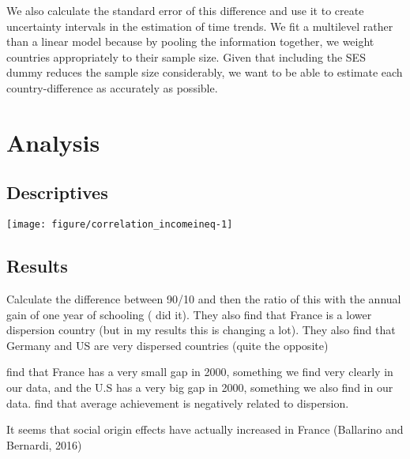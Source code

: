 \documentclass[11pt, a4paper]{article}\usepackage[]{graphicx}\usepackage[]{color}
\begin{document}
We also calculate the standard error of this difference and use it to create uncertainty intervals in the estimation of time trends. We fit a multilevel rather than a linear model because by pooling the information together, we weight countries appropriately to their sample size. Given that including the SES dummy reduces the sample size considerably, we want to be able to estimate each country-difference as accurately as possible.

\section{Analysis}

\subsection{Descriptives}










{\centering \texttt{[image: figure/correlation\_incomeineq-1]} 

}




\subsection{Results}

Calculate the difference between 90/10 and then the ratio of this with the annual gain of one year of schooling (\citet{micklewright} did it). They also find that France is a lower dispersion country (but in my results this is changing a lot). They also find that Germany and US are very dispersed countries (quite the opposite)

\citet{micklewright} find that France has a very small gap in 2000, something we find very clearly in our data, and the U.S has a very big gap in 2000, something we also find in our data. \citet{micklewright} find
that average achievement is negatively related to dispersion.

It seems that social origin effects have actually increased in France  (Ballarino and Bernardi, 2016)
\end{document}
